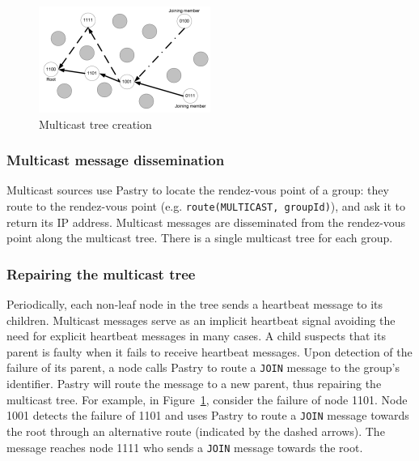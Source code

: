 \documentclass[a4paper,12pt]{article}
\begin{document}
\begin{figure}[t!]
  \centering
  \includegraphics[width=0.5\textwidth]{img/scribe}
  \caption{\label{fig:scribe} Multicast tree creation}
\end{figure}

\subsubsection{Multicast message dissemination}

Multicast sources use Pastry to locate the rendez-vous point of a group: they route to the rendez-vous point (e.g. \texttt{route(MULTICAST, groupId)}), and ask it to return its IP address.
Multicast messages are disseminated from the rendez-vous point along the multicast tree. There is a single multicast tree for each group.

\subsubsection{Repairing the multicast tree}

Periodically, each non-leaf node in the tree sends a heartbeat message to its children. Multicast messages serve as an implicit heartbeat signal avoiding the need for explicit heartbeat messages in many cases. A child suspects that its parent is faulty when it fails to receive heartbeat messages. Upon detection of the failure of its parent, a node calls Pastry to route a \texttt{JOIN} message to the group’s identifier. Pastry will route the message to a new parent, thus repairing the multicast tree.
For example, in Figure~\ref{fig:scribe}, consider the failure of node 1101. Node 1001 detects the failure of 1101 and uses Pastry to route a \texttt{JOIN} message towards the root through an alternative route (indicated by the dashed arrows). The message reaches node 1111 who sends a \texttt{JOIN} message towards the root.

\clearpage
\end{document}
